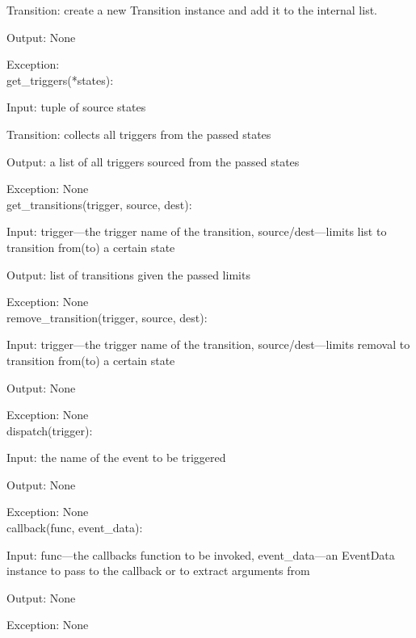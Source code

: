 \documentclass[12pt,titlepage]{article}
\begin{document}
Transition: create a new Transition instance and add it to the internal list.

Output: None

Exception: \\
get\_triggers(*states):

Input: tuple of source states

Transition: collects all triggers from the passed states

Output: a list of all triggers sourced from the passed states

Exception: None \\
get\_transitions(trigger, source, dest):

Input: trigger---the trigger name of the transition, source/dest---limits list
to transition from(to) a certain state

Output: list of transitions given the passed limits

Exception: None \\
remove\_transition(trigger, source, dest):

Input: trigger---the trigger name of the transition, source/dest---limits
removal to transition from(to) a certain state

Output: None

Exception: None \\
dispatch(trigger):

Input: the name of the event to be triggered

Output: None

Exception: None \\
callback(func, event\_data):

Input: func---the callbacks function to be invoked, event\_data---an EventData
instance to pass to the callback or to extract arguments from

Output: None

Exception: None \\
\end{document}
